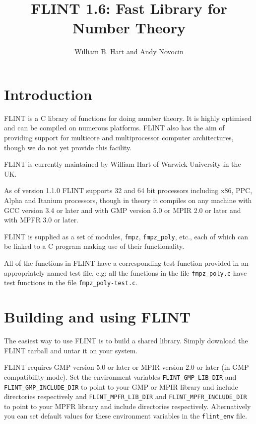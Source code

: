 \documentclass[a4paper,10pt]{article}
\title{FLINT 1.6: Fast Library for Number Theory}
\author{William B. Hart and Andy Novocin}
\newcommand{\code}{\lstinline}
\begin{document}
\maketitle
\tableofcontents
\lstset{language=c}
\lstset{basicstyle=\ttfamily}
\lstset{keywordstyle=}
\lstset{escapeinside=\%\%}

\section{Introduction}

FLINT is a C library of functions for doing number theory. It is highly optimised and can be compiled on
numerous platforms. FLINT also has the aim of providing support for multicore and multiprocessor computer 
architectures, though we do not yet provide this facility.

FLINT is currently maintained by William Hart of Warwick University in the UK.

As of version 1.1.0 FLINT supports 32 and 64 bit processors including x86, PPC, Alpha and Itanium processors, 
though in theory it compiles on any machine with GCC version 3.4 or later and with GMP version 5.0 or 
MPIR 2.0 or later and with MPFR 3.0 or later.

FLINT is supplied as a set of modules, \code{fmpz}, \code{fmpz_poly}, etc., each of which can be linked to 
a C program making use of their functionality. 

All of the functions in FLINT have a corresponding test function provided in an appropriately named test 
file, e.g: all the functions in the file \code{fmpz_poly.c} have test functions in the file 
\code{fmpz_poly-test.c}.

\section{Building and using FLINT}

The easiest way to use FLINT is to build a shared library. Simply download the FLINT tarball and untar it
on your system.

FLINT requires GMP version 5.0 or later or MPIR version 2.0 or later (in GMP compatibility mode). Set the 
environment variables \code{FLINT_GMP_LIB_DIR} and \code{FLINT_GMP_INCLUDE_DIR} to point to your GMP or 
MPIR library and include directories respectively and \code{FLINT_MPFR_LIB_DIR} and 
\code{FLINT_MPFR_INCLUDE_DIR} to point to your MPFR library and include directories respectively. 
Alternatively you can set default values for these environment variables in the \code{flint_env} file.
\end{document}
